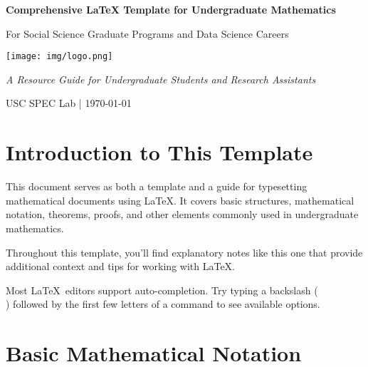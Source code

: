 \documentclass[11pt,a4paper]{article}
\begin{document}
\begin{center}
    \vspace*{0.5cm}
    {\color{burgundycardinal} \LARGE \textbf{Comprehensive LaTeX Template for Undergraduate Mathematics}}
    
    \vspace{0.2cm}
    {\color{richcharcoal} \large For Social Science Graduate Programs and Data Science Careers}
    
    \vspace{0.3cm}
    \texttt{[image: img/logo.png]}
    
    \vspace{0.2cm}
    {\small \textit{A Resource Guide for Undergraduate Students and Research Assistants}}
    
    \vspace{0.2cm}
    {\small \textcolor{richcharcoal}{USC SPEC Lab | \today}}
\end{center}

\vspace{2em}

\section*{Introduction to This Template}

This document serves as both a template and a guide for typesetting mathematical documents using \LaTeX. It covers basic structures, mathematical notation, theorems, proofs, and other elements commonly used in undergraduate mathematics.

\begin{notebox}
Throughout this template, you'll find explanatory notes like this one that provide additional context and tips for working with \LaTeX.
\end{notebox}

\begin{tipbox}
Most \LaTeX\ editors support auto-completion. Try typing a backslash (\\) followed by the first few letters of a command to see available options.
\end{tipbox}

\section{Basic Mathematical Notation}
\end{document}
